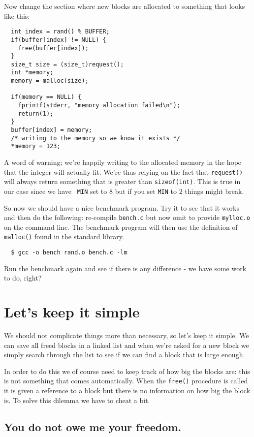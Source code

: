\documentclass[a4paper,11pt]{article}
\begin{document}
Now change the section where new blocks are allocated to something that
looks like this:

\begin{lstlisting}
  int index = rand() % BUFFER;
  if(buffer[index] != NULL) {
    free(buffer[index]);
  }
  size_t size = (size_t)request();
  int *memory; 
  memory = malloc(size);
  
  if(memory == NULL) {
    fprintf(stderr, "memory allocation failed\n");
    return(1);
  }
  buffer[index] = memory;
  /* writing to the memory so we know it exists */
  *memory = 123;
\end{lstlisting}

A word of warning; we're happily writing to the allocated memory in
the hope that the integer will actually fit. We're thus relying on the
fact that {\tt request()} will always return something that is greater
than {\tt sizeof(int)}. This is true in our case since we have {\tt
  MIN} set to $8$ but if you set {\tt MIN} to $2$ things might break. 

So now we should have a nice benchmark program. Try it to see that it
works and then do the following: re-compile {\tt bench.c} but now omit to
provide {\tt mylloc.o} on the command line. The benchmark program will
then use the definition of {\tt malloc()} found in the standard
library.

\begin{verbatim}
  $ gcc -o bench rand.o bench.c -lm
\end{verbatim}

Run the benchmark again and see if there is any difference - we have
some work to do, right?

\section{Let's keep it simple}

We should not complicate things more than necessary, so let's keep it
simple. We can save all freed blocks in a linked list and when we're
asked for a new block we simply search through the list to see if we
can find a block that is large enough.

In order to do this we of course need to keep track of how big the blocks
are: this is not something that comes automatically. When the
{\tt free()} procedure is called it is given a reference to a block
but there is no information on how big the block is. To solve this
dilemma we have to cheat a bit.


\subsection{You do not owe me your freedom.}
\end{document}
